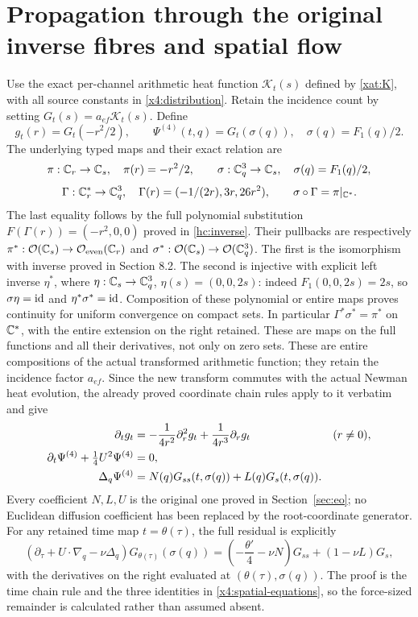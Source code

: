 \section{Propagation through the original inverse fibres and spatial flow}
\label{sec:x4-spatial}

Use the exact per-channel arithmetic heat function $\mathcal K_t(s)$
defined by \eqref{xat:K}, with all source constants in
\eqref{x4:distribution}. Retain the incidence count by setting
$G_t(s)=a_{ef}\mathcal K_t(s)$. Define
\[
g_t(r)=G_t(-r^2/2),\qquad
\Psi^{(4)}(t,q)=G_t(\sigma(q)),\quad\sigma(q)=F_1(q)/2.
\]
The underlying typed maps and their exact relation are
\[
\pi:\mathbb C_r\to\mathbb C_s,\quad\pi(r)=-r^2/2,\qquad
\sigma:\mathbb C^3_q\to\mathbb C_s,\quad\sigma(q)=F_1(q)/2,
\]
\[
\Gamma:\mathbb C_r^*\to\mathbb C_q^3,\quad
\Gamma(r)=(-1/(2r),3r,26r^2),\qquad
\sigma\circ\Gamma=\pi|_{\mathbb C^*}.
\]
The last equality follows by the full polynomial substitution
$F(\Gamma(r))=(-r^2,0,0)$ proved in \eqref{hc:inverse}.
Their pullbacks are respectively
$\pi^*:\mathcal O(\mathbb C_s)\to\mathcal O_{\rm even}(\mathbb C_r)$ and
$\sigma^*:\mathcal O(\mathbb C_s)\to\mathcal O(\mathbb C_q^3)$.
The first is the isomorphism with inverse proved in Section 8.2.
The second is injective with explicit left inverse
$\eta^*$, where $\eta:\mathbb C_s\to\mathbb C_q^3$, $\eta(s)=(0,0,2s)$:
indeed $F_1(0,0,2s)=2s$, so $\sigma\eta=\operatorname{id}$ and
$\eta^*\sigma^*=\operatorname{id}$. Composition of these polynomial or entire
maps proves continuity for uniform convergence on compact sets.
In particular $\Gamma^*\sigma^*=\pi^*$ on $\mathbb C^*$, with the
entire extension on the right retained. These are maps on the full
functions and all their derivatives, not only on zero sets.
These are entire compositions of the actual transformed arithmetic
function; they retain the incidence factor $a_{ef}$. Since the new
transform commutes with the actual Newman heat evolution, the already
proved coordinate chain rules apply to it verbatim and give
\begin{align}
\partial_tg_t&=
 -\frac1{4r^2}\partial_r^2g_t+\frac1{4r^3}\partial_rg_t
                       &&(r\ne0),\notag\\
\partial_t\Psi^{(4)}+\tfrac14U^2\Psi^{(4)}&=0,\notag\\
\Delta_q\Psi^{(4)}&=N(q)G_{ss}(t,\sigma(q))+
                              L(q)G_s(t,\sigma(q)).
\label{x4:spatial-equations}
\end{align}
Every coefficient $N,L,U$ is the original one proved in
Section~\ref{sec:eo}; no Euclidean diffusion coefficient has been
replaced by the root-coordinate generator. For any retained time map
$t=\theta(\tau)$, the full residual is explicitly
\[
(\partial_\tau+U\cdot\nabla_q-\nu\Delta_q)
 G_{\theta(\tau)}(\sigma(q))
=\left(-\frac{\theta'}4-\nu N\right)G_{ss}
                         +(1-\nu L)G_s,
\]
with the derivatives on the right evaluated at
$(\theta(\tau),\sigma(q))$. The proof is the time chain rule and the
three identities in \eqref{x4:spatial-equations}, so the force-sized
remainder is calculated rather than assumed absent.

